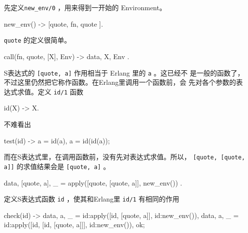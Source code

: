 \documentclass[preview,multi,crop=false,border=1in,class=memoir]{standalone}
\begin{document}
\begin{preview-page}
先定义\verb|new_env/0| ，用来得到一开始的 Environment。

\begin{SourceCode}
new_env() ->
    [{quote, {fn, quote}}
].
\end{SourceCode}

\verb|quote| 的定义很简单。

\begin{SourceCode}
call({fn, quote}, [X], Env) ->
    {{data, X}, Env}
.
\end{SourceCode}

S表达式的 \verb|[quote, a]| 作用相当于 Erlang 里的 \verb|a| 。这已经不
是一般的函数了，不过这里仍然把它称作函数。在Erlang里调用一个函数前，会
先对各个参数的表达式求值。定义 \verb|id/1| 函数

\begin{SourceCode}
id(X) ->
    X.
\end{SourceCode}

不难看出

\begin{SourceCode}
test(id) ->
    a = id(a),
    a = id(id(a));
\end{SourceCode}

而在S表达式里，在调用函数前，没有先对表达式求值。所以，
\verb|[quote, [quote, a]]| 的求值结果会是 \verb|[quote, a]| 。

\begin{SourceCode}
    {{data, [quote, a]}, _} =
        apply([quote, [quote, a]], new_env())
.
\end{SourceCode}


\begin{Exercise}[title={id},difficulty=1]
定义S表达式函数 \verb|id| ，使其和Erlang里 \verb|id/1| 有相同的作用

\begin{SourceCode}
check(id) ->
    {{data, a}, _} =
        id:apply([id, [quote, a]], id:new_env()),
    {{data, a}, _} =
        id:apply([id, [id, [quote, a]]], id:new_env()),
    ok;
\end{SourceCode}


\end{Exercise}
\end{preview-page}
\end{document}
